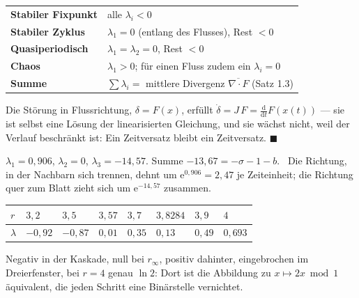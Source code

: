 \begin{merksatz}
\begin{center}
{\small
\renewcommand{\arraystretch}{1.5}
\begin{tabular}{@{}P{3.4cm}P{5.4cm}@{}}
\toprule
\textbf{Stabiler Fixpunkt} & alle $\lambda_i < 0$\\
\textbf{Stabiler Zyklus} & $\lambda_1 = 0$ (entlang des Flusses), Rest $< 0$\\
\textbf{Quasiperiodisch} & $\lambda_1 = \lambda_2 = 0$, Rest $< 0$\\
\textbf{Chaos} & $\lambda_1 > 0$; für einen Fluss zudem ein $\lambda_i = 0$\\
\textbf{Summe} & $\sum\lambda_i = $ mittlere Divergenz $\overline{\nabla\cdot F}$ (Satz 1.3)\\
\bottomrule
\end{tabular}}
\end{center}

Die Störung in Flussrichtung, $\delta = F(x)$, erfüllt $\dot\delta = J\,F = \frac{\mathrm d}{\mathrm dt}F(x(t))$ --- sie ist selbst eine Lösung der linearisierten Gleichung, und sie wächst nicht, weil der Verlauf beschränkt ist: Ein Zeitversatz bleibt ein Zeitversatz. $\blacksquare$

$\lambda_1 = 0{,}906$, $\lambda_2 = 0$, $\lambda_3 = -14{,}57$. Summe $-13{,}67 = -\sigma - 1 - b$. \checkmark\ Die Richtung, in der Nachbarn sich trennen, dehnt um $\mathrm e^{0{,}906} = 2{,}47$ je Zeiteinheit; die Richtung quer zum Blatt zieht sich um $\mathrm e^{-14{,}57}$ zusammen.

\begin{center}
{\small
\renewcommand{\arraystretch}{1.46}
\begin{tabular}{@{}P{1.0cm}P{1.0cm}P{1.0cm}P{1.0cm}P{1.0cm}P{1.2cm}P{1.0cm}P{1.0cm}@{}}
\toprule
$r$ & $3{,}2$ & $3{,}5$ & $3{,}57$ & $3{,}7$ & $3{,}8284$ & $3{,}9$ & $4$\\
\midrule
$\lambda$ & $-0{,}92$ & $-0{,}87$ & $0{,}01$ & $0{,}35$ & $0{,}13$ & $0{,}49$ & $0{,}693$\\
\bottomrule
\end{tabular}}
\end{center}
Negativ in der Kaskade, null bei $r_\infty$, positiv dahinter, eingebrochen im Dreierfenster, bei $r = 4$ genau $\ln2$: Dort ist die Abbildung zu $x\mapsto 2x \bmod 1$ äquivalent, die jeden Schritt eine Binärstelle vernichtet.


\end{merksatz}

